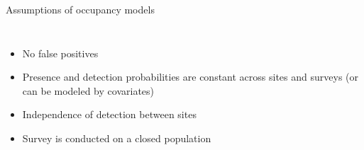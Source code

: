 \documentclass{beamer}
\begin{document}
\begin{frame}{Assumptions of occupancy models}
	\begin{columns}
		\column{5cm}
		\begin{itemize}
			\item No false positives
			\item Presence and detection probabilities are constant across sites
			and surveys (or can be modeled by covariates)
			\item Independence of detection between sites
			\item Survey is conducted on a closed population
		\end{itemize}
		\column{5cm}
	\end{columns}
\end{frame}
\end{document}
